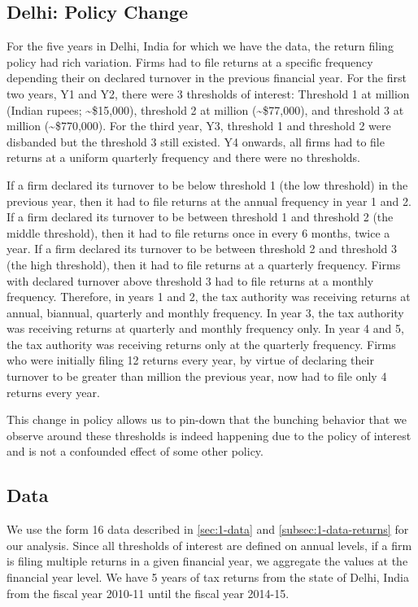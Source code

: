 \subsection{Delhi: Policy Change}
\label{subsec:3-background}
For the five years in Delhi, India for which we have the data, the return filing policy had rich variation. Firms had to file returns at a specific frequency depending their on declared turnover in the previous financial year. For the first two years, Y1 and Y2, there were 3 thresholds of interest: Threshold 1 at  million  (Indian rupees; \textasciitilde{}\$15,000), threshold 2 at  million  (\textasciitilde{}\$77,000), and threshold 3 at  million  (\textasciitilde{}\$770,000). For the third year, Y3, threshold 1 and threshold 2 were disbanded but the threshold 3 still existed. Y4 onwards, all firms had to file returns at a uniform quarterly frequency and there were no thresholds. 

If a firm declared its turnover to be below threshold 1 (the low threshold) in the previous year, then it had to file returns at the annual frequency in year 1 and 2. If a firm declared its turnover to be between threshold 1 and threshold 2 (the middle threshold), then it had to file returns once in every 6 months, twice a year. If a firm declared its turnover to be between threshold 2 and threshold 3 (the high threshold), then it had to file returns at a quarterly frequency. Firms with declared turnover above threshold 3 had to file returns at a monthly frequency. Therefore, in years 1 and 2, the tax authority was receiving returns at annual, biannual, quarterly and monthly frequency. In year 3, the tax authority was receiving returns at quarterly and monthly frequency only. In year 4 and 5, the tax authority was receiving returns only at the quarterly frequency. Firms who were initially filing 12 returns every year, by virtue of declaring their turnover to be greater than  million the previous year, now had to file only 4 returns every year. 

This change in policy allows us to pin-down that the bunching behavior that we observe around these thresholds is indeed happening due to the policy of interest and is not a confounded effect of some other policy. 

\subsection{Data}
\label{subsec:3-data}
We use the form 16 data described in \cref{sec:1-data} and \cref{subsec:1-data-returns} for our analysis. Since all thresholds of interest are defined on annual levels, if a firm is filing multiple returns in a given financial year, we aggregate the values at the financial year level. We have 5 years of tax returns from the state of Delhi, India from the fiscal year 2010-11 until the fiscal year 2014-15.

